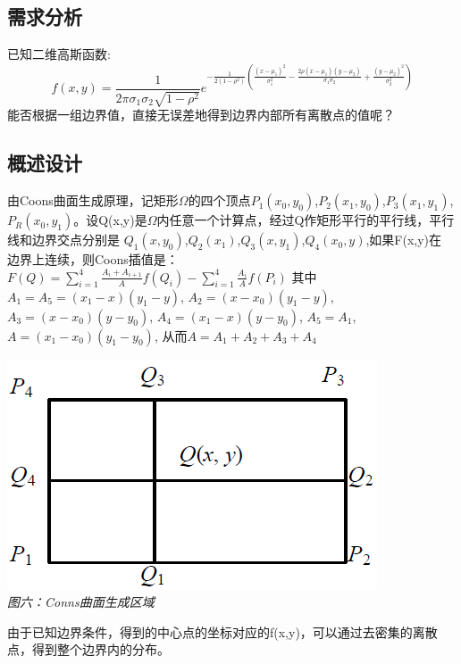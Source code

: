 \documentclass[UTF8,a4paper]{article}
\begin{document}
\subsection{需求分析}
已知二维高斯函数:
$$
f(x,y)=\frac{1}{2\pi \sigma_1\sigma_2\sqrt{1-\rho^2}}e^{-\frac{1}{2(1-\rho^2)}(\frac{(x-\mu_1)^2}{\sigma_1^2}-\frac{2\rho(x-\mu_1)(y-\mu_2)}{\sigma_1\sigma_2}+\frac{(y-\mu_2)^2}{\sigma_2^2})}
$$
能否根据一组边界值，直接无误差地得到边界内部所有离散点的值呢？
\subsection{概述设计}
由Coons曲面生成原理，记矩形$\Omega$的四个顶点$P_1(x_0,y_0)$,$P_2(x_1,y_0)$,$P_3(x_1,y_1)$,$P_R(x_0,y_1)$。设Q(x,y)是$\Omega$内任意一个计算点，经过Q作矩形平行的平行线，平行线和边界交点分别是
$Q_1(x,y_0)$,$Q_2(x_1)$,$Q_3(x,y_1)$,$Q_4(x_0,y)$,如果F(x,y)在 边界上连续，则Coons插值是：
$F(Q)=\sum_{i=1}^{4} \frac{A_i+A_{i+1}}{A}f(Q_i)-\sum_{i=1}^{4} \frac{A_i}{A} f(P_i)$
其中$A_1=A_5=(x_1-x)(y_1-y)$,
$A_2=(x-x_0)(y_1-y)$,
$A_3=(x-x_0)(y-y_0)$,
$A_4=(x_1-x)(y-y_0)$,
$A_5=A_1$,
$A=(x_1-x_0)(y_1-y_0)$,
从而$A=A_1+A_2+A_3+A_4$\\
\begin{center}
    \includegraphics[scale=0.6]{conns.png}\\
    \textit{图六：Conns曲面生成区域}
\end{center}
由于已知边界条件，得到的中心点的坐标对应的f(x,y)，可以通过去密集的离散点，得到整个边界内的分布。
\end{document}

